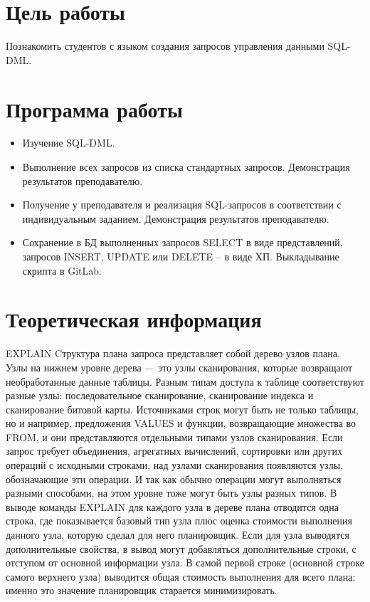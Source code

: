 







\section{Цель работы}
Познакомить студентов с языком создания запросов управления данными SQL-DML.

\section{Программа работы}
\begin{itemize}
	\item Изучение SQL-DML.
	\item Выполнение всех запросов из списка стандартных запросов. Демонстрация результатов преподавателю.
	\item Получение у преподавателя и реализация SQL-запросов в соответствии с индивидуальным заданием. Демонстрация результатов преподавателю.
	\item Сохранение в БД выполненных запросов SELECT в виде представлений, запросов INSERT, UPDATE или DELETE -- в виде ХП. Выкладывание скрипта в GitLab.
\end{itemize}

\section{Теоретическая информация}
\large{EXPLAIN}
Cтруктура плана запроса представляет собой дерево узлов плана. Узлы на нижнем уровне дерева — это узлы сканирования, которые возвращают необработанные данные таблицы. Разным типам доступа к таблице соответствуют разные узлы: последовательное сканирование, сканирование индекса и сканирование битовой карты. Источниками строк могут быть не только таблицы, но и например, предложения VALUES и функции, возвращающие множества во FROM, и они представляются отдельными типами узлов сканирования. Если запрос требует объединения, агрегатных вычислений, сортировки или других операций с исходными строками, над узлами сканирования появляются узлы, обозначающие эти операции. И так как обычно операции могут выполняться разными способами, на этом уровне тоже могут быть узлы разных типов. В выводе команды EXPLAIN для каждого узла в дереве плана отводится одна строка, где показывается базовый тип узла плюс оценка стоимости выполнения данного узла, которую сделал для него планировщик. Если для узла выводятся дополнительные свойства, в вывод могут добавляться дополнительные строки, с отступом от основной информации узла. В самой первой строке (основной строке самого верхнего узла) выводится общая стоимость выполнения для всего плана; именно это значение планировщик старается минимизировать.

